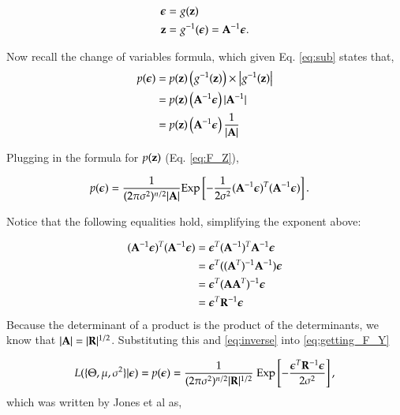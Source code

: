 \begin{align}
\bm{\epsilon} &= g(\mathbf{z}) \nonumber \\
\mathbf{z} &= g^{-1}(\bm{\epsilon}) = \mathbf{A}^{-1}\bm{\epsilon}.
\label{eq:sub}
\end{align}

Now recall the change of variables formula, which given Eq. \ref{eq:sub} states that,
\begin{align} \label{eq:change_of_vars}
p(\bm{\epsilon}) &= p(\mathbf{z})\left (g^{-1}(\mathbf{z})\right)\times \left | g^{-1}(\mathbf{z}) \right | \\
			 &= p(\mathbf{z})\left (\mathbf{A}^{-1}\bm{\epsilon}\right) |\mathbf{A}^{-1}| \\ 
			 &= p(\mathbf{z})\left (\mathbf{A}^{-1}\bm{\epsilon}\right) \frac{1}{|\mathbf{A}|}
\end{align}

Plugging in the formula for $p(\mathbf{z})$ (Eq. \ref{eq:F_Z}), 

\begin{align} \label{eq:getting_F_Y}
p(\bm{\epsilon}) &= \frac{1}{(2\pi\sigma^2)^{n/2}|\mathbf{A}|} \text{Exp}\left [ -\frac{1}{2\sigma^2}(\mathbf{A}^{-1}\bm{\epsilon})^T(\mathbf{A}^{-1}\bm{\epsilon})\right ].
\end{align}

Notice that the following equalities hold, simplifying the exponent above:

\begin{align}
(\mathbf{A}^{-1}\bm{\epsilon})^T(\mathbf{A}^{-1}\bm{\epsilon}) &= \bm{\epsilon}^T(\mathbf{A}^{-1})^T\mathbf{A}^{-1}\bm{\epsilon} \nonumber\\
			 						 &= \bm{\epsilon}^T((\mathbf{A}^T)^{-1}\mathbf{A}^{-1})\bm{\epsilon}\nonumber\\
									 &= \bm{\epsilon}^T(\mathbf{A}\mathbf{A}^T)^{-1}\bm{\epsilon}\nonumber\\
									 &= \bm{\epsilon}^T\mathbf{R}^{-1}\bm{\epsilon}
									 \label{eq:inverse}
\end{align}
Because the determinant of a product is the product of the determinants, we know that  $|\mathbf{A}|=|\mathbf{R}|^{1/2}$. Substituting this and \ref{eq:inverse} into \ref{eq:getting_F_Y}

\begin{equation} \label{eq:likelihood1}
L(\{\Theta, \mu, \sigma^2\}|\bm{\epsilon}) = p(\bm{\epsilon})=\frac{1}
  {(2\pi\sigma^2)^{n/2}|\mb{R}|^{1/2}}\ 
\text{Exp} \left 
  [ -\frac
    {\bm{\epsilon}^T\mb{R}^{-1}\bm{\epsilon}}
    {2\sigma^2} 
\right ],
\end{equation}
which was written by Jones et al as,

